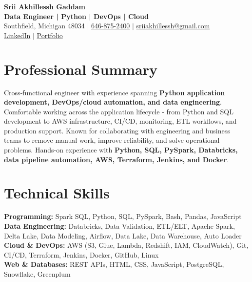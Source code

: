 \documentclass[letterpaper,10pt]{article}
\begin{document}
\fontsize{9.35pt}{10.45pt}\selectfont

\begin{center}
    {\LARGE \textbf{Srii Akhillessh Gaddam}} \\[-1pt]
    \textbf{Data Engineer | Python | DevOps | Cloud} \\[2pt]
    Southfield, Michigan 48034 $|$
    \href{tel:6468752400}{646-875-2400} $|$
    \href{mailto:sriiakhillessh@gmail.com}{sriiakhillessh@gmail.com} \\[1pt]
    \href{https://www.linkedin.com/in/srii-akhiilessh-gaddam-b48668191/}{LinkedIn} $|$
    \href{https://sriiakhillesshg.github.io/portfolio/}{Portfolio}
\end{center}
\vspace{-8pt}

\section{Professional Summary}
\small{Cross-functional engineer with experience spanning \textbf{Python application development, DevOps/cloud automation, and data engineering}. Comfortable working across the application lifecycle - from Python and SQL development to AWS infrastructure, CI/CD, monitoring, ETL workflows, and production support. Known for collaborating with engineering and business teams to remove manual work, improve reliability, and solve operational problems. Hands-on experience with \textbf{Python, SQL, PySpark, Databricks, data pipeline automation, AWS, Terraform, Jenkins, and Docker}.}

\section{Technical Skills}
\small{
\textbf{Programming:} Spark SQL, Python, SQL, PySpark, Bash, Pandas, JavaScript \\
\textbf{Data Engineering:} Databricks, Data Validation, ETL/ELT, Apache Spark, Delta Lake, Data Modeling, Airflow, Data Lake, Data Warehouse, Auto Loader \\
\textbf{Cloud \& DevOps:} AWS (S3, Glue, Lambda, Redshift, IAM, CloudWatch), Git, CI/CD, Terraform, Jenkins, Docker, GitHub, Linux \\
\textbf{Web \& Databases:} REST APIs, HTML, CSS, JavaScript, PostgreSQL, Snowflake, Greenplum
}
\end{document}
